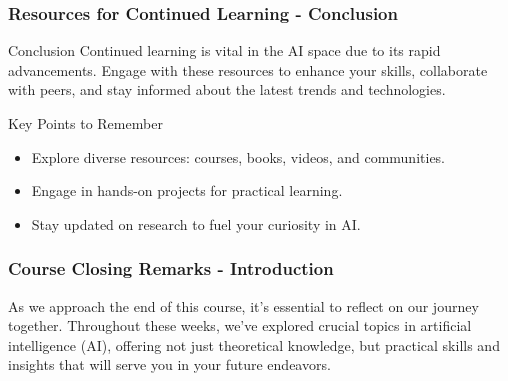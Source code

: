 \documentclass[aspectratio=169]{beamer}
\begin{document}
\begin{frame}[fragile]
    \frametitle{Resources for Continued Learning - Conclusion}
    \begin{block}{Conclusion}
        Continued learning is vital in the AI space due to its rapid advancements. Engage with these resources to enhance your skills, collaborate with peers, and stay informed about the latest trends and technologies.
    \end{block}
    
    \begin{block}{Key Points to Remember}
        \begin{itemize}
            \item Explore diverse resources: courses, books, videos, and communities.
            \item Engage in hands-on projects for practical learning.
            \item Stay updated on research to fuel your curiosity in AI.
        \end{itemize}
    \end{block}
\end{frame}

\begin{frame}[fragile]
    \frametitle{Course Closing Remarks - Introduction}
    As we approach the end of this course, it’s essential to reflect on our journey together. Throughout these weeks, we've explored crucial topics in artificial intelligence (AI), offering not just theoretical knowledge, but practical skills and insights that will serve you in your future endeavors.
\end{frame}
\end{document}
